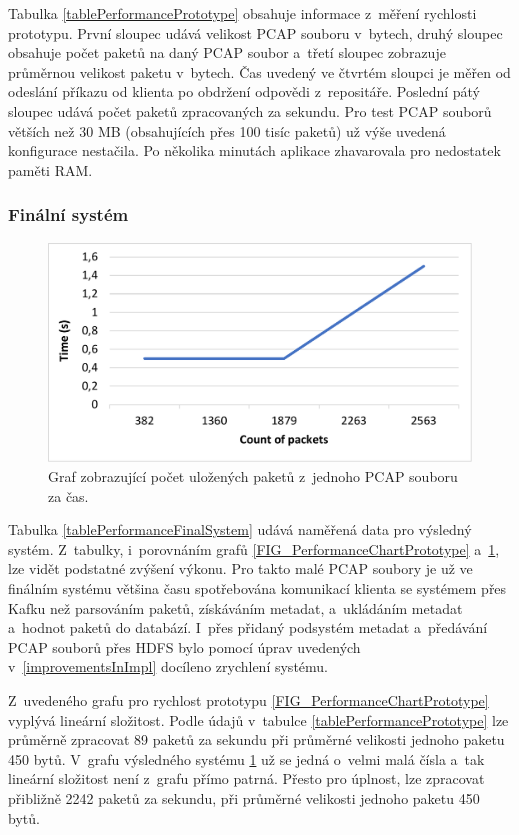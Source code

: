 Tabulka \ref{tablePerformancePrototype} obsahuje informace z~měření rychlosti prototypu. První sloupec udává velikost PCAP souboru v~bytech, druhý sloupec obsahuje počet paketů na daný PCAP soubor a~třetí sloupec zobrazuje průměrnou velikost paketu v~bytech. Čas uvedený ve čtvrtém sloupci je měřen od odeslání příkazu od klienta po obdržení odpovědi z~repositáře. Poslední pátý sloupec udává počet paketů zpracovaných za sekundu. Pro test PCAP souborů větších než 30 MB (obsahujících přes 100 tisíc paketů) už výše uvedená konfigurace nestačila. Po několika minutách aplikace zhavarovala pro nedostatek paměti RAM.

\subsubsection{Finální systém}

\begin{figure}[!h]
    \centering
    \includegraphics[width=15cm]{template-fig/PerformanceChartFinal.pdf}
    \caption{Graf zobrazující počet uložených paketů z~jednoho PCAP souboru za čas.}
    \label{FIG_PerformanceChartFinalSystem}
\end{figure}

\noindent Tabulka \ref{tablePerformanceFinalSystem} udává naměřená data pro výsledný systém. Z~tabulky, i~porovnáním grafů \ref{FIG_PerformanceChartPrototype} a~\ref{FIG_PerformanceChartFinalSystem}, lze vidět podstatné zvýšení výkonu. Pro takto malé PCAP soubory je už ve finálním systému většina času spotřebována komunikací klienta se systémem přes Kafku než parsováním paketů, získáváním metadat, a~ukládáním metadat a~hodnot paketů do databází. I~přes přidaný podsystém metadat a~předávání PCAP souborů přes HDFS bylo pomocí úprav uvedených v~\ref{improvementsInImpl} docíleno zrychlení systému.

Z~uvedeného grafu pro rychlost prototypu \ref{FIG_PerformanceChartPrototype} vyplývá lineární složitost. Podle údajů v~tabulce \ref{tablePerformancePrototype} lze průměrně zpracovat 89 paketů za sekundu při průměrné velikosti jednoho paketu 450 bytů. V~grafu výsledného systému \ref{FIG_PerformanceChartFinalSystem} už se jedná o~velmi malá čísla a~tak lineární složitost není z~grafu přímo patrná. Přesto pro úplnost, lze zpracovat přibližně 2242 paketů za sekundu, při průměrné velikosti jednoho paketu 450 bytů.

